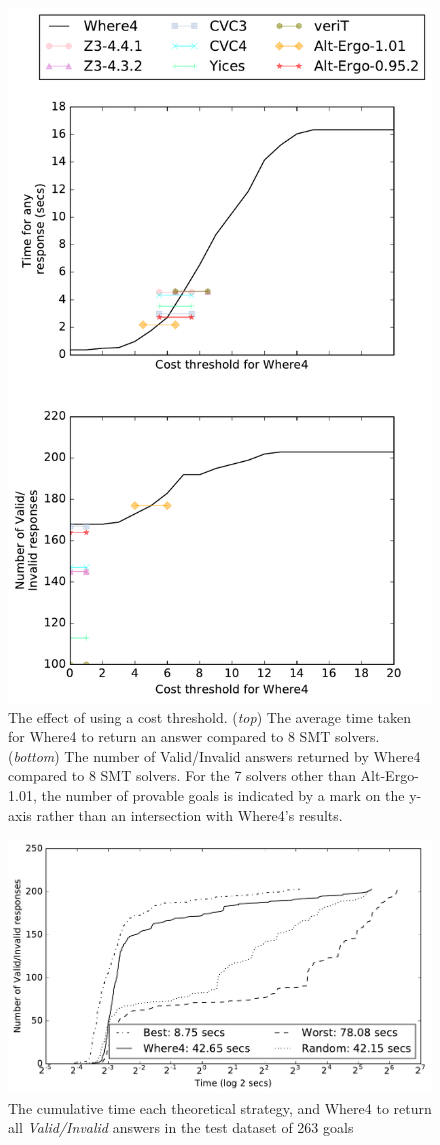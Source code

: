 \documentclass[submission,copyright,creativecommons]{eptcs}
\begin{document}
\begin{figure}
	\centering
	\includegraphics[width=0.8\linewidth]{thresholds}
	\caption{The effect of using a cost threshold. (\textit{top}) The average time taken for \textsf{Where4} to return an answer compared to 8 SMT solvers. (\textit{bottom}) The number of Valid/Invalid answers returned by \textsf{Where4} compared to 8 SMT solvers. For the 7 solvers other than Alt-Ergo-1.01, the number of provable goals is indicated by a mark on the y-axis rather than an intersection with \textsf{Where4}'s results.}
	\label{fig:thresholds}
\end{figure}


\begin{figure}
	\centering
	\includegraphics[width=0.8\linewidth]{line-graph-eval-provers}
	\caption{The cumulative time each theoretical strategy, and \textsf{Where4} to return all \textit{Valid/Invalid} answers in the test dataset of 263 goals}
	\label{fig:line-graph-eval-provers}
\end{figure}
\end{document}
